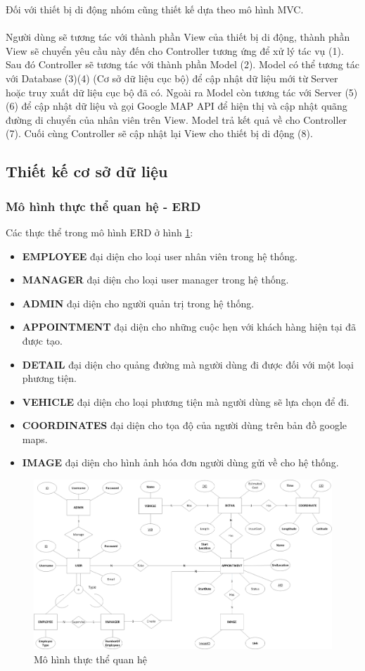 \documentclass[a4paper]{article}
\begin{document}
\clearpage
\noindent
Đối với thiết bị di động nhóm cũng thiết kế dựa theo mô hình MVC.\\
\\
Người dùng sẽ tương tác với thành phần View của thiết bị di động, thành phần View sẽ chuyển yêu cầu này đến cho Controller tương ứng để xử lý tác vụ (1). Sau đó Controller sẽ tương tác với thành phần Model (2). Model có thể tương tác với Database (3)(4) (Cơ sở dữ liệu cục bộ) để cập nhật dữ liệu mới từ Server hoặc truy xuất dữ liệu cục bộ đã có. Ngoài ra Model còn tương tác với Server (5)(6) để cập nhật dữ liệu và gọi Google MAP API để hiện thị và cập nhật quãng đường di chuyển của nhân viên trên View. Model trả kết quả về cho Controller (7). Cuối cùng Controller sẽ cập nhật lại View cho thiết bị di động (8).
\subsection{Thiết kế cơ sở dữ liệu}
\subsubsection{Mô hình thực thể quan hệ - ERD}
Các thực thể trong mô hình ERD ở hình \ref{fig:erd}:
\begin{itemize}
    \item \textbf{EMPLOYEE} đại diện cho loại user nhân viên trong hệ thống. 
    \item \textbf{MANAGER} đại diện cho loại user manager trong hệ thống.
    \item \textbf{ADMIN} đại diện cho người quản trị trong hệ thống.
    \item \textbf{APPOINTMENT} đại diện cho những cuộc hẹn với khách hàng hiện tại đã được tạo.
    \item \textbf{DETAIL} đại diện cho quảng đường mà người dùng đi được đối với một loại phương tiện.
    \item \textbf{VEHICLE} đại diện cho loại phương tiện mà người dùng sẽ lựa chọn để đi.
    \item \textbf{COORDINATES} đại diện cho tọa độ của người dùng trên bản đồ google maps.
    \item \textbf{IMAGE} đại diện cho hình ảnh hóa đơn người dùng gửi về cho hệ thống. 
\end{itemize}
\begin{figure}
    \includegraphics[scale=0.44]{erd}
    \caption{Mô hình thực thể quan hệ}
    \label{fig:erd}
\end{figure}
\end{document}
